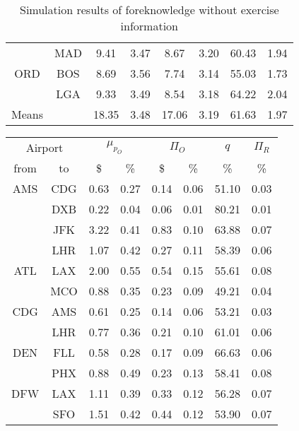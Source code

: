 \begin{table}
\begin{center}
\begin{tabular}{c c | c c | c c | c | c }
~    &  MAD  &    9.41  &  3.47  &    8.67  &  3.20  &  60.43  &  1.94 \\[.5ex]
ORD  &  BOS  &    8.69  &  3.56  &    7.74  &  3.14  &  55.03  &  1.73 \\
~    &  LGA  &    9.33  &  3.49  &    8.54  &  3.18  &  64.22  &  2.04 \\
\midrule
Means &  ~   &   18.35  &  3.48  &   17.06  &  3.19  &  61.63  &  1.97 \\
    \bottomrule
\end{tabular}
\caption{Simulation results of foreknowledge without exercise information}
\label{tbl:resultsSecond}
\end{center}
\end{table}




\begin{table}
\begin{center}
\begin{tabular}{c c | c c | c c | c | c }
\toprule
\multicolumn{2}{c|}{Airport}  &  \multicolumn{2}{c|}{$\mu_{p_O}$} & \multicolumn{2}{c|}{$\Pi_O$}  &  $q$  & $\Pi_R$ \\[.4ex]
from  &  to  &  \$  & \%  &  \$  & \%  & \%  & \% \\
    \midrule
AMS  &  CDG  &    0.63  &  0.27  &    0.14  &  0.06  &  51.10  &  0.03 \\
~    &  DXB  &    0.22  &  0.04  &    0.06  &  0.01  &  80.21  &  0.01 \\
~    &  JFK  &    3.22  &  0.41  &    0.83  &  0.10  &  63.88  &  0.07 \\
~    &  LHR  &    1.07  &  0.42  &    0.27  &  0.11  &  58.39  &  0.06 \\[.5ex]
ATL  &  LAX  &    2.00  &  0.55  &    0.54  &  0.15  &  55.61  &  0.08 \\
~    &  MCO  &    0.88  &  0.35  &    0.23  &  0.09  &  49.21  &  0.04 \\[.5ex]
CDG  &  AMS  &    0.61  &  0.25  &    0.14  &  0.06  &  53.21  &  0.03 \\
~    &  LHR  &    0.77  &  0.36  &    0.21  &  0.10  &  61.01  &  0.06 \\[.5ex]
DEN  &  FLL  &    0.58  &  0.28  &    0.17  &  0.09  &  66.63  &  0.06 \\
~    &  PHX  &    0.88  &  0.49  &    0.23  &  0.13  &  58.41  &  0.08 \\[.5ex]
DFW  &  LAX  &    1.11  &  0.39  &    0.33  &  0.12  &  56.28  &  0.07 \\
~    &  SFO  &    1.51  &  0.42  &    0.44  &  0.12  &  53.90  &  0.07 \\[.5ex]

\end{tabular}
\end{center}
\end{table}
